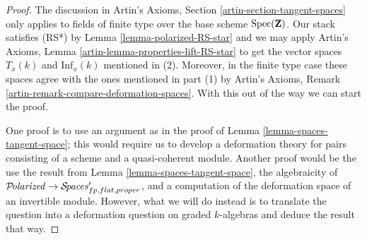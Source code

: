 \begin{proof}
The discussion in Artin's Axioms, Section \ref{artin-section-tangent-spaces}
only applies to fields of finite type over the base scheme $\mathop{\mathrm{Spec}}(\mathbf{Z})$.
Our stack satisfies (RS*) by Lemma \ref{lemma-polarized-RS-star}
and we may apply
Artin's Axioms, Lemma \ref{artin-lemma-properties-lift-RS-star}
to get the vector spaces $T_x(k)$ and $\text{Inf}_x(k)$
mentioned in (2). Moreover, in the finite type case these spaces agree with the
ones mentioned in part (1)
by Artin's Axioms, Remark \ref{artin-remark-compare-deformation-spaces}.
With this out of the way we can start the proof.

\medskip\noindent
One proof is to use an argument as in the proof of
Lemma \ref{lemma-spaces-tangent-space}; this would
require us to develop a deformation theory for pairs
consisting of a scheme and a quasi-coherent module.
Another proof would be the use the result from
Lemma \ref{lemma-spaces-tangent-space},
the algebraicity of
$\mathcal{P}\!\mathit{olarized} \to \mathcal{S}\!\mathit{paces}'_{fp, flat, proper}$,
and a computation of the deformation space of an
invertible module. However, what we will do instead
is to translate the question into a deformation question
on graded $k$-algebras and deduce the result that way.


\end{proof}

